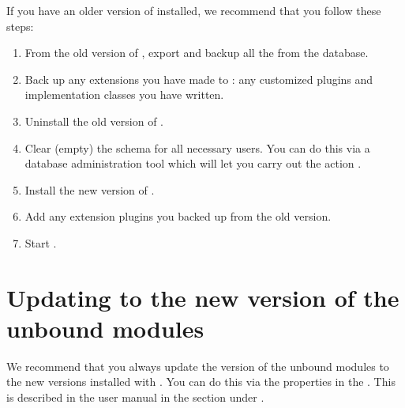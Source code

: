 If you have an older version of \app{} installed, we recommend that you follow these steps:

\begin{enumerate}
\item From the old version of \app{}, export and backup all the \gdprojects{} from the database. 
\item Back up any extensions you have made to \app{}: any customized plugins and implementation classes you have written.  
\item Uninstall the old version of \app{}. 
\item Clear (empty) the \gddb{} schema for all necessary \app{} users. You can do this via a database administration tool which will let you carry out the action . 
\item Install the new version of \app{}.
\item Add any extension plugins you backed up from the old version.
\item Start \app{}.  

\end{enumerate}

\section{Updating to the new version of the unbound modules}
We recommend that you always update the version of the unbound modules \gdprojects{} to the new versions installed with \app{}. You can do this via the \gdproject{} properties in the \ite{}. This is described in the user manual in the  section under \bxname{\gdprojects{}}. 

